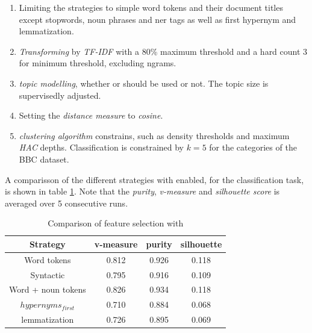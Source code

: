     \begin{enumerate}
      \item Limiting the strategies to simple word tokens and their document titles except stopwords, noun phrases and ner tags as well as \wordnet{} first hypernym and \wordnet{}lemmatization.

      \item \emph{Transforming} by \emph{TF-IDF} with a 80\% maximum threshold and a hard count $3$ for minimum threshold, excluding ngrams.

      \item \emph{topic modelling}, whether \lsa{} or \lda{} should be used or not. The topic size is supervisedly adjusted.

      \item Setting the \emph{distance measure} to \emph{cosine}.

      \item \emph{clustering algorithm} constrains, such as density thresholds and maximum \emph{HAC} depths. Classification is constrained by $k=5$ for the categories of the BBC dataset.
    \end{enumerate}

  A comparisson of the different strategies with \lsa{} enabled, for the classification task, is shown in table \ref{comparison_single_with_lsa}. Note that the \emph{purity}, \emph{v-measure} and \emph{silhouette score} is averaged over 5 consecutive runs.

    \begin{table}\label{comparison_single_with_lsa}
      \begin{tabular}{ c | c | c | c }
        Strategy    & v-measure & purity  & silhouette \\ \hline
        Word tokens & 0.812     & 0.926   & 0.118      \\
        Syntactic   & 0.795     & 0.916     & 0.109 \\
        Word + noun tokens & 0.826   & 0.934     & 0.118 \\
        \wordnet{} $hypernyms_{first}$ & 0.710   & 0.884     & 0.068 \\
        \wordnet{} lemmatization   & 0.726   & 0.895     & 0.069 \\
      \end{tabular}
      \caption{Comparison of feature selection with \lsa{}}
    \end{table}

